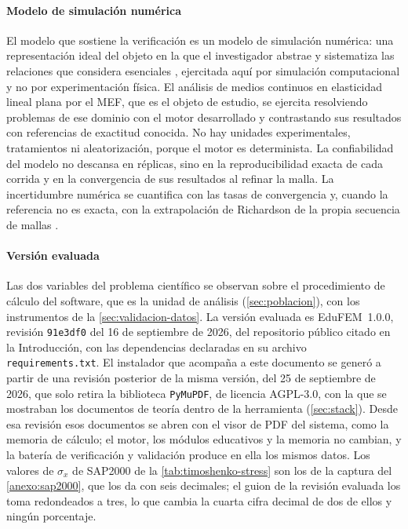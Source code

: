 \paragraph{Modelo de simulación numérica} El modelo que sostiene la verificación es un modelo de simulación numérica: una representación ideal del objeto en la que el investigador abstrae y sistematiza las relaciones que considera esenciales \autocite[p.~21]{alvarez_metodologia}, ejercitada aquí por simulación computacional y no por experimentación física. El análisis de medios continuos en elasticidad lineal plana por el MEF, que es el objeto de estudio, se ejercita resolviendo problemas de ese dominio con el motor desarrollado y contrastando sus resultados con referencias de exactitud conocida. No hay unidades experimentales, tratamientos ni aleatorización, porque el motor es determinista. La confiabilidad del modelo no descansa en réplicas, sino en la reproducibilidad exacta de cada corrida y en la convergencia de sus resultados al refinar la malla. La incertidumbre numérica se cuantifica con las tasas de convergencia y, cuando la referencia no es exacta, con la extrapolación de Richardson de la propia secuencia de mallas \autocite[pp.~309-312]{oberkampf2010vv}.

\paragraph{Versión evaluada} Las dos variables del problema científico se observan sobre el procedimiento de cálculo del software, que es la unidad de análisis (\autoref{sec:poblacion}), con los instrumentos de la \autoref{sec:validacion-datos}. La versión evaluada es EduFEM~1.0.0, revisión \texttt{91e3df0} del 16 de septiembre de 2026, del repositorio público citado en la Introducción, con las dependencias declaradas en su archivo \texttt{requirements.txt}. El instalador que acompaña a este documento se generó a partir de una revisión posterior de la misma versión, del 25 de septiembre de 2026, que solo retira la biblioteca \texttt{PyMuPDF}, de licencia AGPL-3.0, con la que se mostraban los documentos de teoría dentro de la herramienta (\autoref{sec:stack}). Desde esa revisión esos documentos se abren con el visor de PDF del sistema, como la memoria de cálculo; el motor, los módulos educativos y la memoria no cambian, y la batería de verificación y validación produce en ella los mismos datos. Los valores de $\sigma_x$ de SAP2000 de la \autoref{tab:timoshenko-stress} son los de la captura del \autoref{anexo:sap2000}, que los da con seis decimales; el guion de la revisión evaluada los toma redondeados a tres, lo que cambia la cuarta cifra decimal de dos de ellos y ningún porcentaje.

